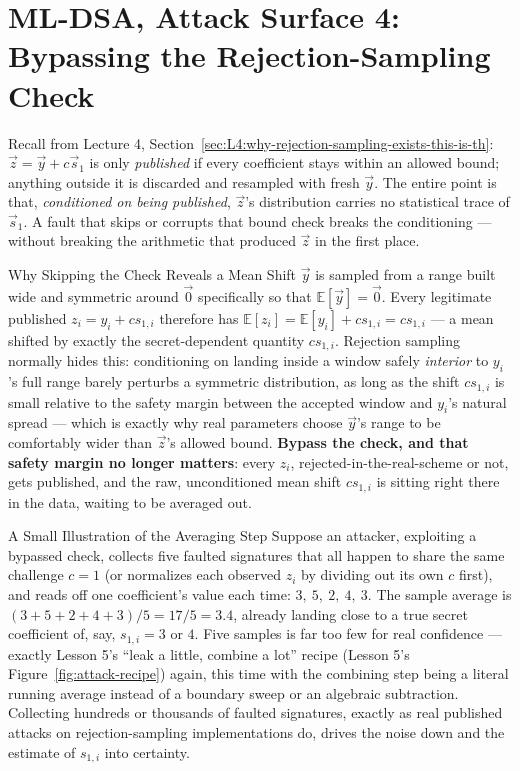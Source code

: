 \section{ML-DSA, Attack Surface 4: Bypassing the Rejection-Sampling Check}
\label{sec:L6:bypassing-rejection-sampling}

Recall from Lecture 4, Section~\ref{sec:L4:why-rejection-sampling-exists-this-is-th}: $\vec z=\vec y+c\vec s_1$ is only \emph{published} if every coefficient stays within an allowed bound; anything outside it is discarded and resampled with fresh $\vec y$. The entire point is that, \emph{conditioned on being published}, $\vec z$'s distribution carries no statistical trace of $\vec s_1$. A fault that skips or corrupts that bound check breaks the conditioning --- without breaking the arithmetic that produced $\vec z$ in the first place.

\begin{rmkbox}{Why Skipping the Check Reveals a Mean Shift}
$\vec y$ is sampled from a range built wide and symmetric around $\vec 0$ specifically so that $\mathbb{E}[\vec y]=\vec 0$. Every legitimate published $z_i = y_i + c s_{1,i}$ therefore has $\mathbb{E}[z_i] = \mathbb{E}[y_i] + cs_{1,i} = cs_{1,i}$ --- a mean shifted by exactly the secret-dependent quantity $cs_{1,i}$. Rejection sampling normally hides this: conditioning on landing inside a window safely \emph{interior} to $y_i$'s full range barely perturbs a symmetric distribution, as long as the shift $cs_{1,i}$ is small relative to the safety margin between the accepted window and $y_i$'s natural spread --- which is exactly why real parameters choose $\vec y$'s range to be comfortably wider than $\vec z$'s allowed bound. \textbf{Bypass the check, and that safety margin no longer matters}: every $z_i$, rejected-in-the-real-scheme or not, gets published, and the raw, unconditioned mean shift $cs_{1,i}$ is sitting right there in the data, waiting to be averaged out.
\end{rmkbox}

\begin{exbox}{A Small Illustration of the Averaging Step}
Suppose an attacker, exploiting a bypassed check, collects five faulted signatures that all happen to share the same challenge $c=1$ (or normalizes each observed $z_i$ by dividing out its own $c$ first), and reads off one coefficient's value each time: $3,\ 5,\ 2,\ 4,\ 3$. The sample average is $(3+5+2+4+3)/5 = 17/5 = 3.4$, already landing close to a true secret coefficient of, say, $s_{1,i}=3$ or $4$. Five samples is far too few for real confidence --- exactly Lesson 5's ``leak a little, combine a lot'' recipe (Lesson 5's Figure~\ref{fig:attack-recipe}) again, this time with the combining step being a literal running average instead of a boundary sweep or an algebraic subtraction. Collecting hundreds or thousands of faulted signatures, exactly as real published attacks on rejection-sampling implementations do, drives the noise down and the estimate of $s_{1,i}$ into certainty.
\end{exbox}

